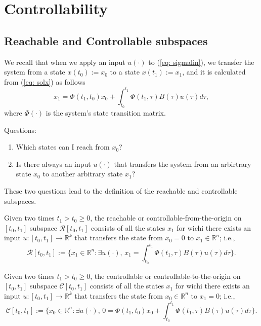 \section{Controllability}
\subsection{Reachable and Controllable subspaces}
We recall that when we apply an input $u(\cdot)$ to (\ref{eq: sigmalin}), we transfer the system from a state $x(t_0):=x_0$ to a state $x(t_1):=x_1$, and it is calculated from (\ref{eq: solx}) as follows
\begin{equation}
	x_1 = \Phi(t_1,t_0)x_0 + \int_{t_0}^{t_1} \Phi(t_1,\tau)B(\tau)u(\tau)d\tau,
\end{equation}
where $\Phi(\cdot)$ is the system's state transition matrix.

Questions: 
\begin{enumerate}
	\item Which states can I reach from $x_0$?
	\item Is there always an input $u(\cdot)$ that transfers the system from an arbirtrary state $x_0$ to another arbitrary state $x_1$?
\end{enumerate}

These two questions lead to the definition of the reachable and controllable subspaces.

\begin{definition}
	Given two times $t_1>t_0\geq 0$, the reachable or controllable-from-the-origin on $[t_0,t_1]$ subspace $\mathcal{R}[t_0,t_1]$ consists of all the states $x_1$ for wichi there exists an input $u:[t_0,t_1]\to \mathbb{R}^k$ that transfers the state from $x_0 = 0$ to $x_1 \in\mathbb{R}^n$; i.e.,
	\begin{equation}
		\mathcal{R}[t_0,t_1] := \Big\{x_1\in\mathbb{R}^n : \exists u(\cdot),\, x_1 = \int_{t_0}^{t_1} \Phi(t_1,\tau)B(\tau)u(\tau)d\tau \Big\}. \label{eq: rs}
	\end{equation}
\end{definition}

\begin{definition}
	Given two times $t_1>t_0\geq 0$, the controllable or controllable-to-the-origin on $[t_0,t_1]$ subspace $\mathcal{C}[t_0,t_1]$ consists of all the states $x_1$ for wichi there exists an input $u:[t_0,t_1]\to \mathbb{R}^k$ that transfers the state from $x_0\in\mathbb{R}^n$ to $x_1 = 0$; i.e.,
	\begin{equation}
		\mathcal{C}[t_0,t_1] := \Big\{x_0\in\mathbb{R}^n : \exists u(\cdot),\, 0 = \Phi(t_1,t_0)x_0 + \int_{t_0}^{t_1} \Phi(t_1,\tau)B(\tau)u(\tau)d\tau \Big\}.
	\end{equation}
\end{definition}

